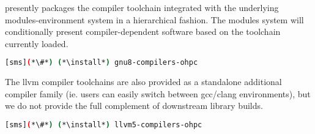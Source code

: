 \OHPC{} presently packages the \GNU{} compiler toolchain integrated with the 
underlying modules-environment system in a hierarchical fashion. The modules
system will conditionally present compiler-dependent software based on the
toolchain currently loaded. 

\begin{lstlisting}[language=bash]
[sms](*\#*) (*\install*) gnu8-compilers-ohpc
\end{lstlisting}

The llvm compiler toolchains are also provided as a standalone additional
compiler family (ie. users can easily switch between gcc/clang environments),
but we do not provide the full complement of downstream library builds.

\begin{lstlisting}[language=bash]
[sms](*\#*) (*\install*) llvm5-compilers-ohpc
\end{lstlisting}
